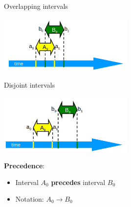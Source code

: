 \begin{frame}[fragile]{Overlapping intervals}

\begin{center}
  \includegraphics[width=0.5\textwidth]{./pics/time/Overlap.png}
\end{center}

\end{frame}


\begin{frame}[fragile]{Disjoint intervals}
\begin{center}
  \includegraphics[width=0.5\textwidth]{./pics/time/Disjoint.png}
\end{center}

\pause
\textbf{Precedence}:
\begin{itemize}
  \item Interval $A_0$ \textbf{precedes} interval $B_0$
  \item Notation: $A_0 \rightarrow B_0$
\end{itemize}

\end{frame}


